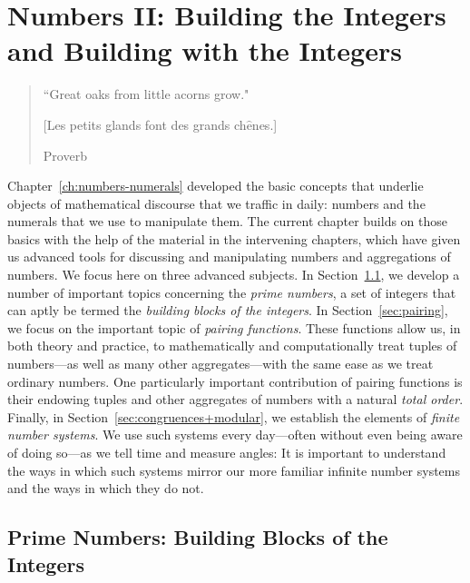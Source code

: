 
\chapter{Numbers II:
Building the Integers and Building with the Integers}
\label{ch:numbers-advanced}

\begin{quote}
``Great oaks from little acorns grow."

[Les petits glands font des grands ch$\hat{\mbox{e}}$nes.]

\hspace*{1.in}Proverb
\end{quote}

\bigskip

\noindent
Chapter~\ref{ch:numbers-numerals} developed the basic concepts that underlie objects of mathematical discourse that we traffic in daily: numbers and the numerals that we use to manipulate them.  The current chapter builds on those basics with the help of the material in the intervening chapters, which have given us advanced tools for discussing and manipulating numbers and aggregations of numbers.  We focus here on three advanced subjects.  In Section~\ref{sec:primes}, we develop a number of important topics concerning the {\em prime numbers}, a set of integers that can aptly be termed the {\it building blocks of the integers}.  In
Section~\ref{sec:pairing}, we focus on the important topic of {\it pairing functions}.  These functions allow us, in both theory and practice, to mathematically and computationally treat tuples of numbers---as well as many other aggregates---with the same ease as we treat ordinary numbers.  One particularly important contribution of pairing functions is their endowing tuples and other aggregates of numbers with a natural {\em total order}.  Finally, in Section~\ref{sec:congruences+modular}, we establish the elements of {\em finite number systems}.  We use such systems every day---often without even being aware of doing so---as we tell time and measure angles: It is important to understand the ways in which such systems mirror our more familiar infinite number systems and the ways in which they do not.
 

\section{Prime Numbers: Building Blocks of the Integers}
\label{sec:primes}

